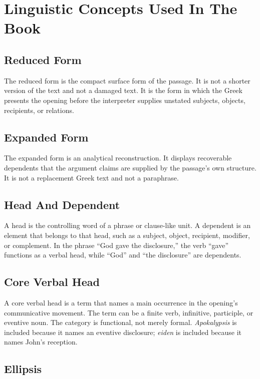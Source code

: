 \chapter{Linguistic Concepts Used In The Book}

\section{Reduced Form}

The reduced form is the compact surface form of the passage. It is not a shorter version of the text and not a damaged text. It is the form in which the Greek presents the opening before the interpreter supplies unstated subjects, objects, recipients, or relations.

\section{Expanded Form}

The expanded form is an analytical reconstruction. It displays recoverable dependents that the argument claims are supplied by the passage's own structure. It is not a replacement Greek text and not a paraphrase.

\section{Head And Dependent}

A head is the controlling word of a phrase or clause-like unit. A dependent is an element that belongs to that head, such as a subject, object, recipient, modifier, or complement. In the phrase ``God gave the disclosure,'' the verb ``gave'' functions as a verbal head, while ``God'' and ``the disclosure'' are dependents.

\section{Core Verbal Head}

A core verbal head is a term that names a main occurrence in the opening's communicative movement. The term can be a finite verb, infinitive, participle, or eventive noun. The category is functional, not merely formal. \textit{Apokalypsis} is included because it names an eventive disclosure; \textit{eiden} is included because it names John's reception.

\section{Ellipsis}

